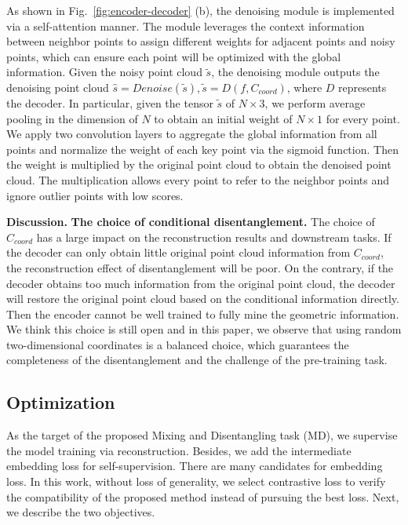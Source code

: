 \documentclass[journal]{IEEEtran}
\begin{document}
As shown in Fig.~\ref{fig:encoder-decoder} (b), the denoising module is implemented via a self-attention manner. 
The module leverages the context information between neighbor points to assign different weights for adjacent points and noisy points, which can ensure each point will be optimized with the global information. 
Given the noisy point cloud $\widetilde{s}$, the denoising module outputs  the denoising point cloud $\hat{s} = Denoise(\widetilde{s}), \widetilde{s} = D(f, C_{coord})$,
where $D$ represents the decoder.
In particular, given the tensor $\widetilde{s}$ of $N\times3$, we perform average pooling in the dimension of $N$ to obtain an initial weight of $N\times1$ for every point. 
We apply two convolution layers to aggregate the global information from all points and normalize the weight of each key point via the sigmoid function. Then the weight is multiplied by the original point cloud to obtain the denoised point cloud. The multiplication allows every point to refer to the neighbor points and ignore outlier points with low scores. 

\textbf{Discussion.} \textbf{The choice of conditional disentanglement.} The choice of $C_{coord}$ has a large impact on the reconstruction results and downstream tasks. If the decoder can only obtain little original point cloud information from $C_{coord}$, the reconstruction effect of disentanglement will be poor. On the contrary, if the decoder obtains too much information from the original point cloud, the decoder will restore the original point cloud based on the conditional information directly. Then the encoder cannot be well trained to fully mine the geometric information. We think this choice is still open and in this paper, we observe that using random two-dimensional coordinates is a balanced choice, which guarantees the completeness of the disentanglement and the challenge of the pre-training task. 


\subsection{Optimization}
As the target of the proposed Mixing and Disentangling task (MD), we supervise the model training via reconstruction.
Besides, we add the intermediate embedding loss for self-supervision. There are many candidates for embedding loss. In this work, without loss of generality, we select contrastive loss to verify the compatibility of the proposed method instead of pursuing the best loss. Next, we describe the two objectives. 
\end{document}
